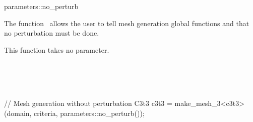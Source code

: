 \ccRefPageBegin


\begin{ccRefFunction}{parameters::no_perturb}  %


\ccDefinition
  
The function \ccRefName\ allows the user to tell mesh generation global functions
 and  that no perturbation must be done.



\ccParameters

This function takes no parameter.

\ccSeeAlso

 \\
 \\
 \\


\ccExample

\begin{ccExampleCode}
// Mesh generation without perturbation
C3t3 c3t3 = make_mesh_3<c3t3>(domain, criteria, parameters::no_perturb());
\end{ccExampleCode}


\end{ccRefFunction}

\ccRefPageEnd

